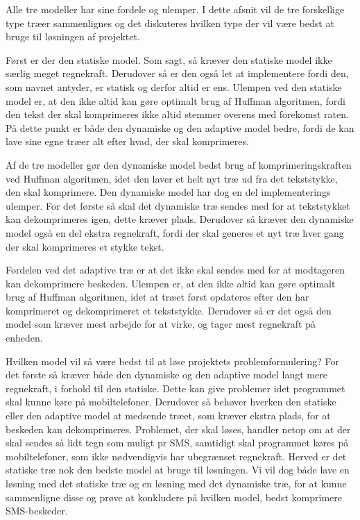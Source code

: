 Alle tre modeller har sine fordele og ulemper. I dette afsnit vil de tre forskellige type træer sammenlignes og det diskuteres hvilken type der vil være bedst at bruge til løsningen af projektet.

Først er der den statiske model. Som sagt, så kræver den statiske model ikke særlig meget regnekraft. Derudover så er den også let at implementere fordi den, som navnet antyder, er statisk og derfor altid er ens. Ulempen ved den statiske model er, at den ikke altid kan gøre optimalt brug af Huffman algoritmen, fordi den tekst der skal komprimeres ikke altid stemmer overens med forekomst raten. På dette punkt er både den dynamiske og den adaptive model bedre, fordi de kan lave sine egne træer alt efter hvad, der skal komprimeres.

Af de tre modeller gør den dynamiske model bedst brug af komprimeringskraften ved Huffman algoritmen, idet den laver et helt nyt træ ud fra det tekststykke, den skal komprimere. Den dynamiske model har dog en del implementerings ulemper. For det første så skal det dynamiske træ sendes med for at tekststykket kan dekomprimeres igen, dette kræver plads. Derudover så kræver den dynamiske model også en del ekstra regnekraft, fordi der skal generes et nyt træ hver gang der skal komprimeres et stykke tekst.

Fordelen ved det adaptive træ er at det ikke skal sendes med for at modtageren kan dekomprimere beskeden. Ulempen er, at den ikke altid kan gøre optimalt brug af Huffman algoritmen, idet at træet først opdateres efter den har komprimeret og dekomprimeret et tekststykke. Derudover så er det også den model som kræver mest arbejde for at virke, og tager mest regnekraft på enheden.

Hvilken model vil så være bedst til at løse projektets problemformulering? For det første så kræver både den dynamiske og den adaptive model langt mere regnekraft, i forhold til den statiske. Dette kan give problemer idet programmet skal kunne køre på mobiltelefoner. Derudover så behøver hverken den statiske eller den adaptive model at medsende træet, som kræver ekstra plads, for at beskeden kan dekomprimeres. Problemet, der skal løses, handler netop om at der skal sendes så lidt tegn som muligt pr SMS, samtidigt skal programmet køres på mobiltelefoner, som ikke nødvendigvis har ubegrænset regnekraft. Herved er det statiske træ nok den bedste model at bruge til løsningen. Vi vil dog både lave en løsning med det statiske træ og en løsning med det dynamiske træ, for at kunne sammenligne disse og prøve at konkludere på hvilken model, bedst komprimere SMS-beskeder.